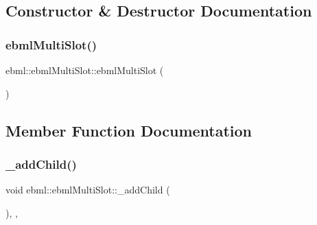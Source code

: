 \subsection{Constructor \& Destructor Documentation}
\mbox{\label{classebml_1_1ebmlMultiSlot_a736f14f96d3a2f8b288e984113c86c9b}} 
\subsubsection{\texorpdfstring{ebml\+Multi\+Slot()}{ebmlMultiSlot()}}
{\footnotesize\ttfamily ebml\+::ebml\+Multi\+Slot\+::ebml\+Multi\+Slot (\begin{DoxyParamCaption}\item[{const \mbox{\hyperlink{classebml_1_1ebmlMultiSlotClass}{ebml\+Multi\+Slot\+Class}} $\ast$}]{ }\end{DoxyParamCaption})\hspace{0.3cm}{\ttfamily [protected]}}



\subsection{Member Function Documentation}
\mbox{\label{classebml_1_1ebmlMultiSlot_ad5f24ddcacb5a5fcc78a8cc50166d092}} 
\subsubsection{\texorpdfstring{\+\_\+add\+Child()}{\_addChild()}\hspace{0.1cm}{\footnotesize\ttfamily [1/2]}}
{\footnotesize\ttfamily void ebml\+::ebml\+Multi\+Slot\+::\+\_\+add\+Child (\begin{DoxyParamCaption}\item[{const \mbox{\hyperlink{namespaceebml_adad533b7705a16bb360fe56380c5e7be}{ebml\+Element\+\_\+sp}} \&}]{ }\end{DoxyParamCaption})\hspace{0.3cm}{\ttfamily [override]}, {\ttfamily [protected]}, {\ttfamily [virtual]}}



